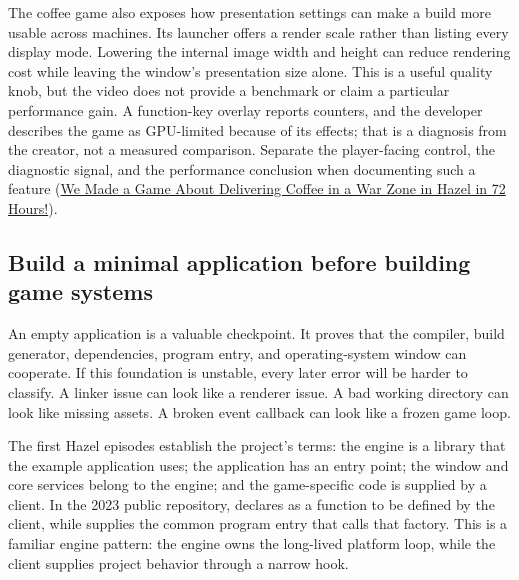 The coffee game also exposes how presentation settings can make a build more usable across machines. Its launcher offers a render scale rather than listing every display mode. Lowering the internal image width and height can reduce rendering cost while leaving the window's presentation size alone. This is a useful quality knob, but the video does not provide a benchmark or claim a particular performance gain. A function-key overlay reports counters, and the developer describes the game as GPU-limited because of its effects; that is a diagnosis from the creator, not a measured comparison. Separate the player-facing control, the diagnostic signal, and the performance conclusion when documenting such a feature (\href{https://www.youtube.com/watch?v=ahrdtYwBLTk&t=1m7s}{We Made a Game About Delivering Coffee in a War Zone in Hazel in 72 Hours!}).

\subsection{Build a minimal application before building game systems}\label{05-engine-i-ch013-build-a-minimal-application-before-building-game-systems}

\hypertarget{05-engine-i-ch013-build-a-minimal-application-before-building-game-systems}{}

An empty application is a valuable checkpoint. It proves that the compiler, build generator, dependencies, program entry, and operating-system window can cooperate. If this foundation is unstable, every later error will be harder to classify. A linker issue can look like a renderer issue. A bad working directory can look like missing assets. A broken event callback can look like a frozen game loop.

The first Hazel episodes establish the project's terms: the engine is a library that the example application uses; the application has an entry point; the window and core services belong to the engine; and the game-specific code is supplied by a client. In the 2023 public repository,  declares  as a function to be defined by the client, while  supplies the common program entry that calls that factory. This is a familiar engine pattern: the engine owns the long-lived platform loop, while the client supplies project behavior through a narrow hook.

